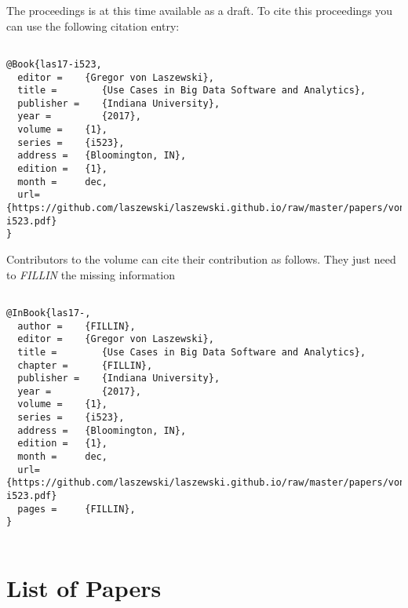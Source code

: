 \documentclass[12pt]{book}
\begin{document}
The proceedings is at this time available as a draft.
To cite this proceedings you can use the following citation entry: 

\begin{verbatim}

@Book{las17-i523,
  editor =    {Gregor von Laszewski},
  title =        {Use Cases in Big Data Software and Analytics},
  publisher =    {Indiana University},
  year =         {2017},
  volume =    {1},
  series =    {i523},  
  address =   {Bloomington, IN},
  edition =   {1},
  month =     dec,
  url={https://github.com/laszewski/laszewski.github.io/raw/master/papers/vonLaszewski-i523.pdf}
}

\end{verbatim}

Contributors to the volume can cite their contribution as
follows. They just need to {\em FILLIN} the missing information

\begin{verbatim}

@InBook{las17-,
  author =    {FILLIN},
  editor =    {Gregor von Laszewski},
  title =        {Use Cases in Big Data Software and Analytics},
  chapter =      {FILLIN},
  publisher =    {Indiana University},
  year =         {2017},
  volume =    {1},
  series =    {i523},
  address =   {Bloomington, IN},
  edition =   {1},
  month =     dec,
  url={https://github.com/laszewski/laszewski.github.io/raw/master/papers/vonLaszewski-i523.pdf}
  pages =     {FILLIN},
}


\end{verbatim}

\section{List of Papers}
\end{document}
